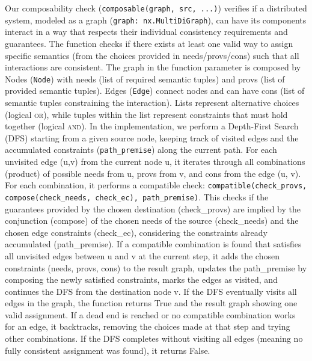 Our composability check (\texttt{composable(graph, src, ...)})
verifies if a distributed system, modeled as a graph (\texttt{graph:
nx.MultiDiGraph}), can have its components interact in a way that
respects their individual consistency requirements and guarantees.
The function checks if there exists at least one valid way to assign
specific semantics (from the choices provided in needs/provs/cons)
such that all interactions are consistent. The graph in the function
parameter is composed by Nodes (\texttt{Node}) with needs (list of
required semantic tuples) and provs (list of provided semantic
tuples). Edges (\texttt{Edge}) connect nodes and can have cons (list
of semantic tuples constraining the interaction). Lists represent
alternative choices (logical \textsc{or}), while tuples within the list
represent constraints that must hold together (logical \textsc{and}). In the
implementation, we perform a Depth-First Search (DFS) starting from a
given source node, keeping track of visited edges and the accumulated
constraints (\texttt{path\_premise}) along the current path. For each
unvisited edge (u,v) from the current node u, it iterates through all
combinations (product) of possible needs from u, provs from v, and
cons from the edge (u, v). For each combination, it performs a
compatible check: \texttt{compatible(check\_provs,
compose(check\_needs, check\_ec), path\_premise)}. This checks if the
guarantees provided by the chosen destination (check\_provs) are
implied by the conjunction (compose) of the chosen needs of the
source (check\_needs) and the chosen edge constraints (check\_ec),
considering the constraints already accumulated (path\_premise). If a
compatible combination is found that satisfies all unvisited edges
between u and v at the current step, it adds the chosen constraints
(needs, provs, cons) to the result graph, updates the path\_premise
by composing the newly satisfied constraints, marks the edges as
visited, and continues the DFS from the destination node v. If the
DFS eventually visits all edges in the graph, the function returns
True and the result graph showing one valid assignment. If a dead end
is reached or no compatible combination works for an edge, it
backtracks, removing the choices made at that step and trying other
combinations. If the DFS completes without visiting all edges
(meaning no fully consistent assignment was found), it returns False.

